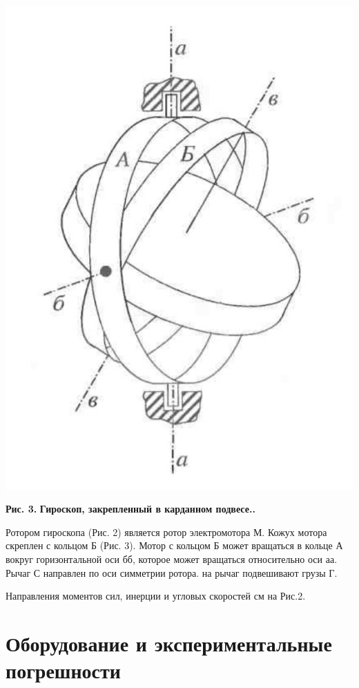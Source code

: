 \begin{center}
\includegraphics[scale = 0.15]{kard.jpeg}
\end{center}
\begin{flushright}
{\scriptsize \textbf{Рис. 3.} \textbf {Гироскоп, закрепленный в карданном подвесе..}}
\end{flushright}

    Ротором гироскопа (Рис. 2) является ротор электромотора М. Кожух мотора скреплен с кольцом Б (Рис. 3). Мотор с кольцом Б может вращаться в кольце А вокруг горизонтальной оси бб, которое может вращаться относительно оси аа. Рычаг С направлен по оси симметрии ротора. на рычаг подвешивают грузы Г.
    
    Направления моментов сил, инерции и угловых скоростей см на Рис.2.

\section{Оборудование и экспериментальные погрешности}


